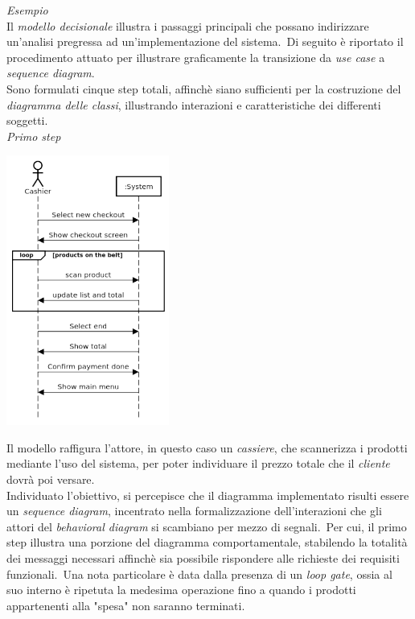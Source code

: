 \documentclass{article}
\begin{document}
\textit{Esempio}\\
Il \textit{modello decisionale} illustra i passaggi principali che possano indirizzare un'analisi pregressa ad un'implementazione del sistema.\ Di seguito è riportato il procedimento attuato per illustrare graficamente la transizione da \textit{use case} a \textit{sequence diagram}.\vspace*{14pt}\\
Sono formulati cinque step totali, affinchè siano sufficienti per la costruzione del \textit{diagramma delle classi}, illustrando interazioni e caratteristiche dei differenti soggetti.\vspace*{14pt}\\
\textit{Primo step}
\begin{center}
    \includegraphics[width=0.4\textwidth]{foto 1.png}
\end{center} 
Il modello raffigura l'attore, in questo caso un \textit{cassiere}, che scannerizza i prodotti mediante l'uso del sistema, per poter individuare il prezzo totale che il \textit{cliente} dovrà poi versare.\vspace*{14pt}\\
Individuato l'obiettivo, si percepisce che il diagramma implementato risulti essere un \textit{sequence diagram}, incentrato nella formalizzazione dell'interazioni che gli attori del \textit{behavioral diagram} si scambiano per mezzo di segnali.\ Per cui, il primo step illustra una porzione del diagramma comportamentale, stabilendo la totalità dei messaggi necessari affinchè sia possibile rispondere alle richieste dei requisiti funzionali.\ Una nota particolare è data dalla presenza di un \textit{loop gate}, ossia al suo interno è ripetuta la medesima operazione fino a quando i prodotti appartenenti alla "spesa" non saranno terminati.\\
\end{document}
